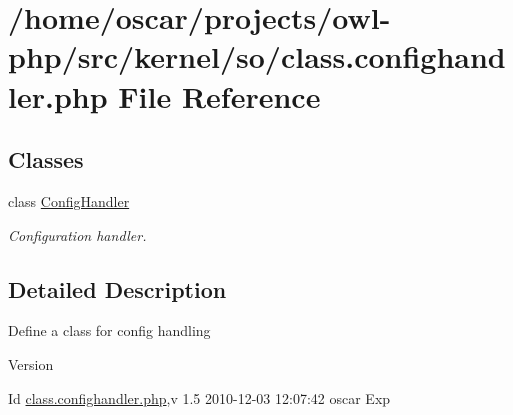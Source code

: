\section{/home/oscar/projects/owl-\/php/src/kernel/so/class.confighandler.php File Reference}
\label{class_8confighandler_8php}
\subsection*{Classes}
\begin{DoxyCompactItemize}
\item 
class \hyperlink{classConfigHandler}{ConfigHandler}
\begin{DoxyCompactList}\small\item\em Configuration handler. \item\end{DoxyCompactList}\end{DoxyCompactItemize}


\subsection{Detailed Description}
Define a class for config handling \begin{DoxyVersion}{Version}

\end{DoxyVersion}
\begin{DoxyParagraph}{Id}
\hyperlink{class_8confighandler_8php}{class.confighandler.php},v 1.5 2010-\/12-\/03 12:07:42 oscar Exp 
\end{DoxyParagraph}

